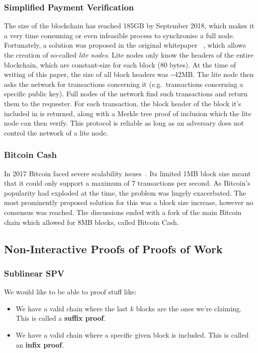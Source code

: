 \documentclass[11pt]{llncs}
\begin{document}
\subsubsection{Simplified Payment Verification}
The size of the blockchain has reached 185GB by September 2018, which makes
it a very time consuming or even infeasible process to synchronise a full
node. Fortunately, a solution was proposed in the original whitepaper
~\cite{bitcoin}, which allows the creation of so-called \textit{lite nodes}.
Lite nodes only know the headers of the entire blockchain, which are
constant-size for each block (80 bytes). At the time of writing of this
paper, the size of all block headers was \~{}42MB\@. The lite node then asks the
network for transactions concerning it (e.g.\ transactions concerning a
specific public key). Full nodes of the network find such transactions and
return them to the requester. For each transaction, the block header of the
block it's included in is returned, along with a Merkle tree proof of
inclusion which the lite node can then verify. This protocol is reliable as
long as an adversary does not control the network of a lite node.

\subsubsection{Bitcoin Cash}
In 2017 Bitcoin faced severe scalability issues~\cite{onscaling}. Its limited
1MB block size meant that it could only support a maximum of 7 transactions per
second. As Bitcoin's popularity had exploded at the time, the problem was
hugely exacerbated. The most prominently proposed solution for this was a block
size increase, however no consensus was reached. The discussions ended with a
fork of the main Bitcoin chain which allowed for 8MB blocks, called Bitcoin
Cash.

\subsection{Non-Interactive Proofs of Proofs of Work}

\subsubsection{Sublinear SPV}
We would like to be able to proof stuff like:

\begin{itemize}
  \item We have a valid chain where the last $k$ blocks are the ones we're
    claiming. This is called a \textbf{suffix proof}.
  \item We have a valid chain where a specific given block is included. This is
    called an \textbf{infix proof}.
\end{itemize}
\end{document}
